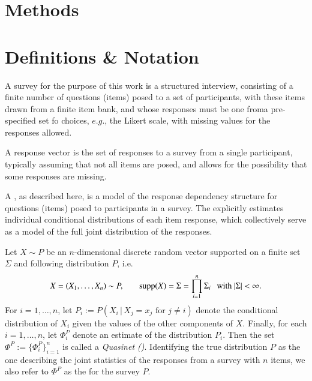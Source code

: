 \documentclass[onecolumn,10pt]{IEEEtran}
\begin{document}
\section*{Methods}
\section{Definitions \& Notation}

\begin{defn}[Survey]
  A survey for the purpose of this work is a structured interview, consisting of a finite number of questions (items) posed to a set of participants, with these items drawn from a finite item bank, and  whose responses must be one froma pre-specified set fo choices, $e.g.$, the Likert scale, with missing values for the responses allowed. 
\end{defn}

\begin{defn}
  A response vector is the set of responses to a survey from a single participant, typically assuming that not all items are posed, and allows for the possibility that some responses are missing.
\end{defn}

A \qnet, as described here, is a model of the response dependency  structure for questions (items) posed to participants in a survey.  The \qnet explicitly estimates individual conditional distributions of each item response, which collectively serve as a model of the full joint distribution of the responses. 

\begin{defn}[\qnet]
  \label{def:qnet}
  Let $X \sim P$ be an $n$-dimensional discrete random vector supported on a finite set $\Sigma$ and following distribution $P$, i.e. \[X = (X_1, \ldots, X_n) \sim P, \hspace{0.25in} \operatorname{supp}(X) =  \Sigma = \displaystyle\prod_{i=1}^n \Sigma_i \hspace{.1in} \text{with } |\Sigma| < \infty.\] For $i = 1, \ldots, n$, let $P_i := P(X_i\,|\,X_j=x_j \text{ for } j \neq i)$ denote the conditional distribution of $X_i$ given the values of the other components of $X$.  Finally, for each $i = 1, \ldots, n$, let $\Phi^P_i$ denote an estimate of the distribution $P_i$.  Then the set $\Phi^P := \{\Phi^P_i\}_{i=1}^n$ is called a \emph{Quasinet (\qnet)}. Identifying the true distribution $P$ as the one describing the joint statistics of the responses from a survey with $n$ items, we also refer to  $\Phi^P$ as the \qnet for the survey $P$.
\end{defn}
\end{document}
